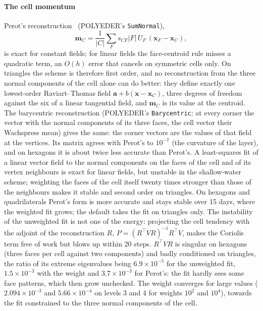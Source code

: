 \documentclass[preprint,12pt]{elsarticle}
\newcommand{\bx}{\mathbf{x}}
\newcommand{\code}[1]{\texttt{#1}}
\theoremstyle{definition}
\begin{document}
\paragraph{The cell momentum} Perot's reconstruction~\cite{Perot2000} (POLYEDER's \code{SumNormal}),
\begin{equation}
\mathbf m_C = \frac{1}{|C|}\sum_F s_{CF}|F|\,U_F\,(\bx_F-\bx_C),
\end{equation}
is exact for constant fields; for linear fields the face-centroid rule misses a quadratic term, an
$O(h)$ error that cancels on symmetric cells only. On triangles the scheme is therefore first order,
and no reconstruction from the three normal components of the cell alone can do better: they define
exactly one lowest-order Raviart--Thomas field $\mathbf a+b(\bx-\bx_C)$, three degrees of freedom
against the six of a linear tangential field, and $\mathbf m_C$ is its value at the centroid. The
barycentric reconstruction (POLYEDER's \code{Barycentric}: at every corner the vector with the normal
components of its three faces, the cell vector their Wachspress mean) gives the same: the corner
vectors are the values of that field at the vertices. Its matrix agrees with Perot's to $10^{-7}$
(the curvature of the layer), and on hexagons it is about twice less accurate than Perot's.
A least-squares fit of a linear vector field to the normal components on the faces of the cell and of
its vertex neighbours is exact for linear fields, but unstable in the shallow-water scheme; weighting
the faces of the cell itself twenty times stronger than those of the neighbours makes it stable and
second order on triangles. On hexagons and quadrilaterals Perot's form is more accurate and stays
stable over 15 days, where the weighted fit grows; the default takes the fit on triangles only.
The instability of the unweighted fit is not one of the energy: projecting the cell tendency with the
adjoint of the reconstruction $R$, $P=(R^\top VR)^{-1}R^\top V$, makes the Coriolis term free of work
but blows up within 20 steps. $R^\top VR$ is singular on hexagons (three faces per cell against two
components) and badly conditioned on triangles, the ratio of its extreme eigenvalues being
$6.9\times10^{-5}$ for the unweighted fit, $1.5\times10^{-3}$ with the weight and $3.7\times10^{-3}$
for Perot's: the fit hardly sees some face patterns, which then grow unchecked. The weight converges
for large values ($2.094\times10^{-3}$ and $5.66\times10^{-4}$ on levels 3 and 4 for weights
$10^2$ and $10^4$), towards the fit constrained to the three normal components of the cell.
\end{document}
